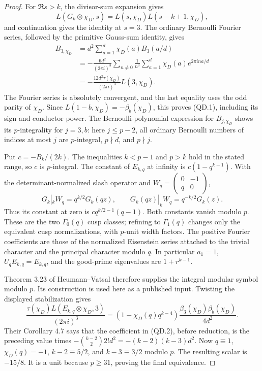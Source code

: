 \documentclass[11pt,a4paper]{article}
\theoremstyle{definition}
\begin{document}
\begin{proof}
For $\Re s>k$, the divisor-sum expansion gives
\[
 L(G_k\otimes\chi_D,s)=L(s,\chi_D)L(s-k+1,\chi_D),
\]
and continuation gives the identity at $s=3$.  The ordinary Bernoulli
Fourier series, followed by the primitive Gauss-sum identity, gives
\[
 \begin{split}
 B_{3,\chi_D}
 &=d^2\sum_{a=1}^{d}\chi_D(a)B_3(a/d)\\
 &=-\frac{6d^2}{(2\pi i)^3}
       \sum_{n\ne0}\frac{1}{n^3}
           \sum_{a=1}^{d}\chi_D(a)e^{2\pi ina/d}\\
 &=-\frac{12d^2\tau(\chi_D)}{(2\pi i)^3}L(3,\chi_D).
 \end{split}
\]
The Fourier series is absolutely convergent, and the last equality uses
the odd parity of $\chi_D$.  Since $L(1-b,\chi_D)=-\beta_b(\chi_D)$,
this proves (QD.1), including its sign and conductor power.
The Bernoulli-polynomial expression for $B_{j,\chi_D}$ shows its
$p$-integrality for $j=3,b$: here $j\leq p-2$, all ordinary Bernoulli
numbers of indices at most $j$ are $p$-integral, $p\nmid d$, and
$p\nmid j$.

Put $c=-B_k/(2k)$.  The inequalities $k<p-1$ and $p>k$ hold in the
stated range, so $c$ is $p$-integral.  The constant of $E_{k,q}$ at
infinity is $c(1-q^{k-1})$.  With the determinant-normalized slash
operator and $W_q=\left(\begin{smallmatrix}0&-1\\q&0\end{smallmatrix}\right)$,
\[
 G_k|_kW_q=q^{k/2}G_k(qz),\qquad
 G_k(qz)|_kW_q=q^{-k/2}G_k(z).
\]
Thus its constant at zero is $c q^{k/2-1}(q-1)$.  Both constants
vanish modulo $p$.  These are the two $\Gamma_0(q)$ cusp classes;
refining to $\Gamma_1(q)$ changes only the equivalent cusp
normalizations, with $p$-unit width factors.  The positive Fourier
coefficients are those of the normalized Eisenstein series attached to
the trivial character and the principal character modulo $q$.
In particular $a_1=1$, $U_qE_{k,q}=E_{k,q}$, and the good-prime
eigenvalues are $1+r^{k-1}$.

Theorem 3.23 of Heumann--Vatsal therefore supplies the integral modular
symbol modulo $p$.  Its construction is used here as a published input.
Twisting the displayed stabilization gives
\[
 \frac{\tau(\chi_D)L(E_{k,q}\otimes\chi_D,3)}{(2\pi i)^3}
  =(1-\chi_D(q)q^{k-4})
        \frac{\beta_3(\chi_D)\beta_b(\chi_D)}{4d^2}.
\]
Their Corollary 4.7 says that the coefficient in (QD.2), before
reduction, is the preceding value times
$-\binom{k-2}{2}2!d^2=-(k-2)(k-3)d^2$.
Now $q\equiv1$, $\chi_D(q)=-1$, $k-2\equiv5/2$, and
$k-3\equiv3/2$ modulo $p$.  The resulting scalar is $-15/8$.
It is a unit because $p\geq31$, proving the final equivalence.
\end{proof}
\end{document}
